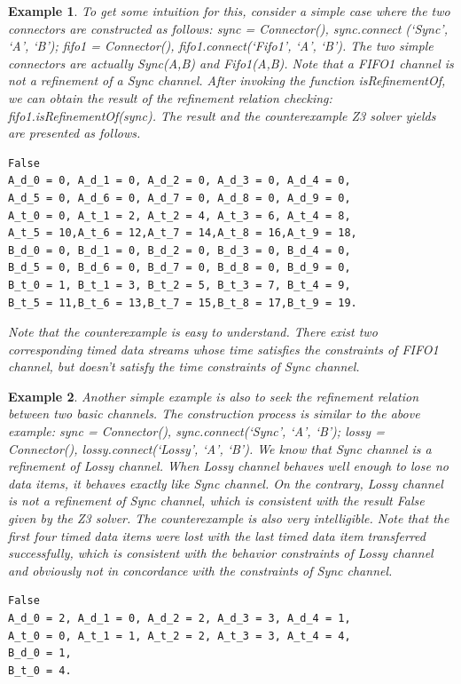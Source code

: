 \documentclass[preprint,3p]{elsarticle}
\newtheorem{example}{Example}[section]
\begin{document}
\begin{example}
To get some intuition for this, consider a simple case where the two connectors are constructed as follows:
\emph{sync = Connector(), sync.connect
(`Sync', `A', `B'); fifo1 = Connector(),
fifo1.connect(`Fifo1', `A', `B')}. 
The two simple connectors are actually \emph{Sync(A,B)} and \emph{Fifo1(A,B)}. Note that a \emph{FIFO1} channel is not a refinement of a \emph{Sync} channel. After invoking the function \emph{isRefinementOf}, we can obtain the result of the refinement relation checking: \emph{fifo1.isRefinementOf(sync)}. The result and the counterexample Z3 solver yields are presented as follows.
\begin{lstlisting}[frame=single]
False
A_d_0 = 0, A_d_1 = 0, A_d_2 = 0, A_d_3 = 0, A_d_4 = 0,
A_d_5 = 0, A_d_6 = 0, A_d_7 = 0, A_d_8 = 0, A_d_9 = 0,
A_t_0 = 0, A_t_1 = 2, A_t_2 = 4, A_t_3 = 6, A_t_4 = 8,
A_t_5 = 10,A_t_6 = 12,A_t_7 = 14,A_t_8 = 16,A_t_9 = 18,
B_d_0 = 0, B_d_1 = 0, B_d_2 = 0, B_d_3 = 0, B_d_4 = 0,
B_d_5 = 0, B_d_6 = 0, B_d_7 = 0, B_d_8 = 0, B_d_9 = 0,
B_t_0 = 1, B_t_1 = 3, B_t_2 = 5, B_t_3 = 7, B_t_4 = 9,
B_t_5 = 11,B_t_6 = 13,B_t_7 = 15,B_t_8 = 17,B_t_9 = 19.
\end{lstlisting}

Note that the counterexample is easy to understand. There exist two corresponding timed data streams whose time satisfies the constraints of \emph{FIFO1} channel, but doesn't satisfy the time constraints of \emph{Sync} channel.
\end{example}
\begin{example}
Another simple example is also to seek the refinement relation between two basic channels. The construction process is similar to the above example: \emph{sync = Connector(), sync.connect(`Sync', `A', `B'); lossy = Connector(), lossy.connect(`Lossy', `A', `B')}. We know that \emph{Sync} channel is a refinement of \emph{Lossy} channel. When \emph{Lossy} channel behaves well enough to lose no data items, it behaves exactly like \emph{Sync} channel. On the contrary, \emph{Lossy} channel is not a refinement of \emph{Sync} channel, which is consistent with the result \emph{False} given by the Z3 solver. The counterexample is also very intelligible. Note that the first four timed data items were lost with the last timed data item transferred successfully, which is consistent with the behavior constraints of \emph{Lossy} channel and obviously not in concordance with the constraints of \emph{Sync} channel.
\begin{lstlisting}[frame=single]
False
A_d_0 = 2, A_d_1 = 0, A_d_2 = 2, A_d_3 = 3, A_d_4 = 1,
A_t_0 = 0, A_t_1 = 1, A_t_2 = 2, A_t_3 = 3, A_t_4 = 4,
B_d_0 = 1,
B_t_0 = 4.
\end{lstlisting}
\end{example}
\end{document}

